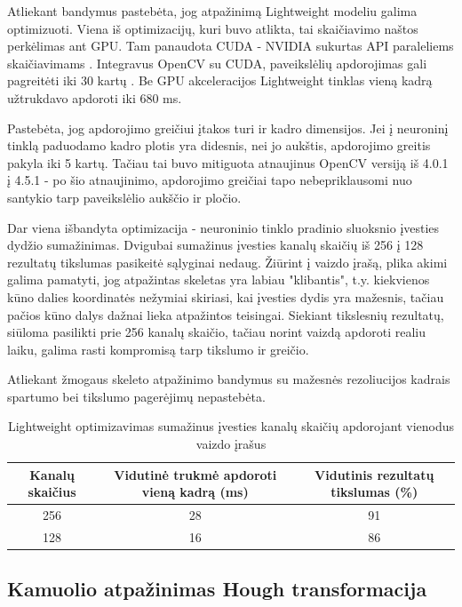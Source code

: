 \documentclass{VUMIFPSbakalaurinis}
\begin{document}
Atliekant bandymus pastebėta, jog atpažinimą Lightweight modeliu galima optimizuoti. Viena iš optimizacijų, kuri buvo atlikta, tai skaičiavimo naštos perkėlimas ant GPU. Tam panaudota CUDA - NVIDIA sukurtas API paraleliems skaičiavimams \cite{cuda}. Integravus OpenCV su CUDA, paveikslėlių apdorojimas gali pagreitėti iki 30 kartų \cite{opencv-cuda}. Be GPU akceleracijos Lightweight tinklas vieną kadrą užtrukdavo apdoroti iki 680 ms. 

Pastebėta, jog apdorojimo greičiui įtakos turi ir kadro dimensijos. Jei į neuroninį tinklą paduodamo kadro plotis yra didesnis, nei jo aukštis, apdorojimo greitis pakyla iki 5 kartų. Tačiau tai buvo mitiguota atnaujinus OpenCV versiją iš 4.0.1 į 4.5.1 - po šio atnaujinimo, apdorojimo greičiai tapo nebepriklausomi nuo santykio tarp paveikslėlio aukščio ir pločio. 

Dar viena išbandyta optimizacija - neuroninio tinklo pradinio sluoksnio įvesties dydžio sumažinimas. Dvigubai sumažinus įvesties kanalų skaičių iš 256 į 128 rezultatų tikslumas pasikeitė sąlyginai nedaug. Žiūrint į vaizdo įrašą, plika akimi galima pamatyti, jog atpažintas skeletas yra labiau "klibantis", t.y. kiekvienos kūno dalies koordinatės nežymiai skiriasi, kai įvesties dydis yra mažesnis, tačiau pačios kūno dalys dažnai lieka atpažintos teisingai. Siekiant tikslesnių rezultatų, siūloma pasilikti prie 256 kanalų skaičio, tačiau norint vaizdą apdoroti realiu laiku, galima rasti kompromisą tarp tikslumo ir greičio. 

Atliekant žmogaus skeleto atpažinimo bandymus su mažesnės rezoliucijos kadrais spartumo bei tikslumo pagerėjimų nepastebėta.

\begin{table}[H]\footnotesize
	\centering
	\caption{Lightweight optimizavimas sumažinus įvesties kanalų skaičių apdorojant vienodus vaizdo įrašus}
	{\begin{tabular}{|c|c|c|} \hline
			\textbf{Kanalų skaičius} & \textbf{Vidutinė trukmė apdoroti vieną kadrą (ms)} & \textbf{Vidutinis rezultatų tikslumas (\%)} \\
			\hline
			256  & 28    & 91       \\
			\hline
			128  & 16    & 86       \\
			\hline
	\end{tabular}}
	\label{tab:openposevslightweight}
\end{table}

\subsection{Kamuolio atpažinimas Hough transformacija}
\end{document}
